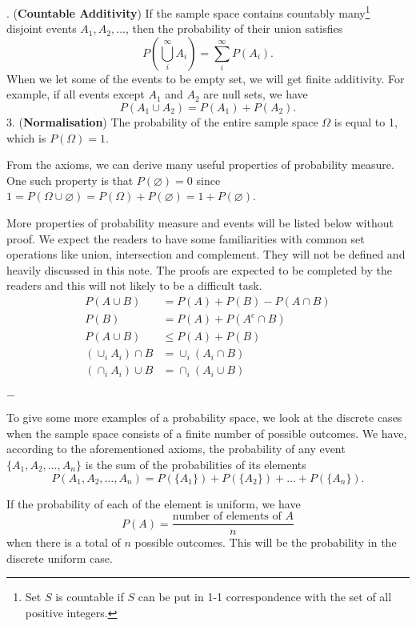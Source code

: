 \documentclass[11pt, a4paper, oneside]{book}
\theoremstyle{definition}
\newcommand{\breaking}{%
    \begin{center}
    $-$
    \end{center}%
}
\begin{document}
. (\textbf{Countable Additivity}) If the sample space contains countably many\footnote{Set $S$ is countable if $S$ can be put in 1-1 correspondence with the set of all positive integers.} disjoint events $A_1, A_2, \dots$, then the probability of their union satisfies\[
P(\bigcup_{i}^{\infty}A_i)=\sum_{i}^{\infty}P(A_i).
\]
When we let some of the events to be empty set, we will get finite additivity. For example, if all events except $A_1$ and $A_2$ are null sets, we have \[
P(A_1\cup A_2) = P(A_1) + P(A_2). 
\]
3. (\textbf{Normalisation}) The probability of the entire sample space $\Omega$ is equal to 1, which is $P(\Omega) = 1$.

\noindent From the axioms, we can derive many useful properties of probability measure. One such property is that $P(\varnothing) = 0$ since $1 = P(\Omega \cup \varnothing) = P(\Omega) + P(\varnothing) = 1 + P(\varnothing)$.    

\noindent More properties of probability measure and events will be listed below without proof. We expect the readers to have some familiarities with common set operations like union, intersection and complement. They will not be defined and heavily discussed in this note. The proofs are expected to be completed by the readers and this will not likely to be a difficult task. 
\begin{equation*}
\begin{split}
P(A \cup B) &= P(A) + P(B) - P(A \cap B) \\
P(B) &= P(A) + P(A^c \cap B)\\
P(A \cup B) &\le P(A) + P(B) \\
(\cup_i A_i)\cap B &= \cup_i (A_i \cap B) \\
(\cap_i A_i)\cup B &= \cap_i (A_i \cup B) \\
\end{split}
\end{equation*}

\breaking

\noindent To give some more examples of a probability space, we look at the discrete cases when the sample space consists of a finite number of possible outcomes. We have, according to the aforementioned axioms, the probability of any event $\{A_1, A_2, \dots, A_n\}$ is the sum of the probabilities of its elements\[
P(A_1, A_2, \dots, A_n) = P(\{A_1\}) +P(\{A_2\}) + \dots + P(\{A_n\}).
\]

\noindent If the probability of each of the element is uniform, we have \[
P(A) = \frac{\text{number of elements of }A}{n}
\]
when there is a total of $n$ possible outcomes. This will be the probability in the discrete uniform case. 
\end{document}
